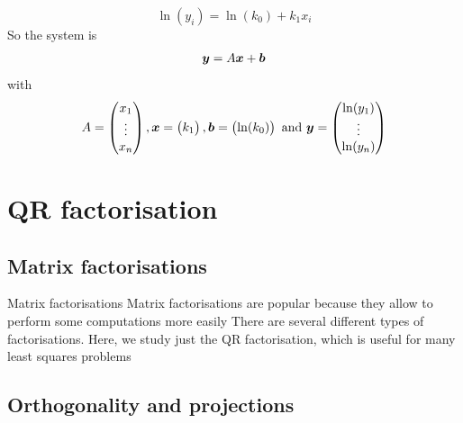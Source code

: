 \documentclass[aspectratio=169]{beamer}\usepackage[]{graphicx}\usepackage[]{xcolor}
\begin{document}
\begin{frame}
\[
\ln(y_i) = \ln (k_0)+k_1x_i
\]
So the system is
\begin{align*}
\bm{y} = A\bm{x}+\bm{b}
\end{align*}
with
\[
A = \begin{pmatrix}
x_1\\ \vdots \\ x_n
\end{pmatrix},
\bm{x} = \begin{pmatrix}
k_1
\end{pmatrix},
\bm{b} = \begin{pmatrix}
\ln (k_0)
\end{pmatrix}
\textrm{ and }
\bm{y} = \begin{pmatrix}
\ln (y_1)\\ \vdots\\ \ln (y_n)
\end{pmatrix}
\]
\end{frame}




\section{QR factorisation}



\subsection{Matrix factorisations}
\begin{frame}{Matrix factorisations}
	Matrix factorisations are popular because they allow to perform some computations more easily
	\vfill
	There are several different types of factorisations. Here, we study just the QR factorisation, which is useful for many least squares problems
\end{frame}	
	

\subsection{Orthogonality and projections}
\end{document}
